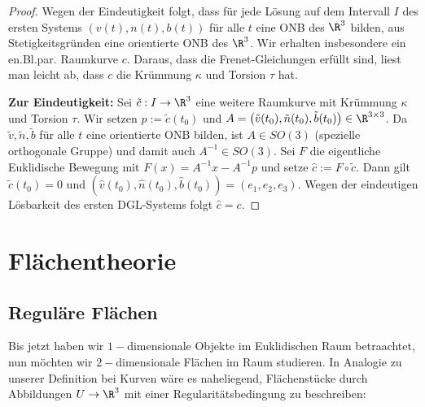 \documentclass{mycourse}
\newcommand{\kp}{\times} 	 		%
\begin{document}
\begin{st}
\begin{proof}
Wegen der Eindeutigkeit folgt, dass für jede Lösung auf dem Intervall $I$ des ersten Systems $\left( v(t), n(t), b(t) \right)$ für alle $t$ eine ONB des $\R^3$ bilden, aus Stetigkeitsgründen eine orientierte ONB des $\R^3$. Wir erhalten insbesondere ein en.Bl.par. Raumkurve $c$. Daraus, dass die Frenet-Gleichungen erfüllt sind, liest man leicht ab, dass $c$ die Krümmung $\kappa$ und Torsion $\tau$ hat.

\textbf{Zur Eindeutigkeit:} Sei $\tilde c: I \to \R^3$ eine weitere Raumkurve mit Krümmung $\kappa$ und Torsion $\tau$. Wir setzen $p := \tilde c(t_0)$ und $A = \left( \tilde v(t_0), \tilde n(t_0), \tilde b(t_0) \right) \in \R^{3 \kp 3}$. Da $\tilde v, \tilde n, \tilde b$ für alle $t$ eine orientierte ONB bilden, ist $A \in SO(3)$ (spezielle orthogonale Gruppe) und damit auch $A^{-1} \in SO(3)$. Sei $F$ die eigentliche Euklidische Bewegung mit $F(x) = A^{-1} x - A^{-1} p$ und setze $\hat c := F \circ \tilde c$. Dann gilt $\tilde c(t_0) = 0$ und $\left(\hat  v(t_0), \hat n(t_0), \hat b(t_0) \right) = \left( e_1, e_2, e_3 \right)$. Wegen der eindeutigen Lösbarkeit des ersten DGL-Systems folgt $\hat c = c$.
\end{proof}
\end{st}

\chapter{Flächentheorie}

\section{Reguläre Flächen}

Bis jetzt haben wir $1-$dimensionale Objekte im Euklidischen Raum betraachtet, nun möchten wir $2-$dimensionale Flächen im Raum studieren. In Analogie zu unserer Definition bei Kurven wäre es naheliegend, Flächenstücke durch Abbildungen $U \to \R^3$ mit einer Regularitätsbedingung zu beschreiben:








\end{document}
